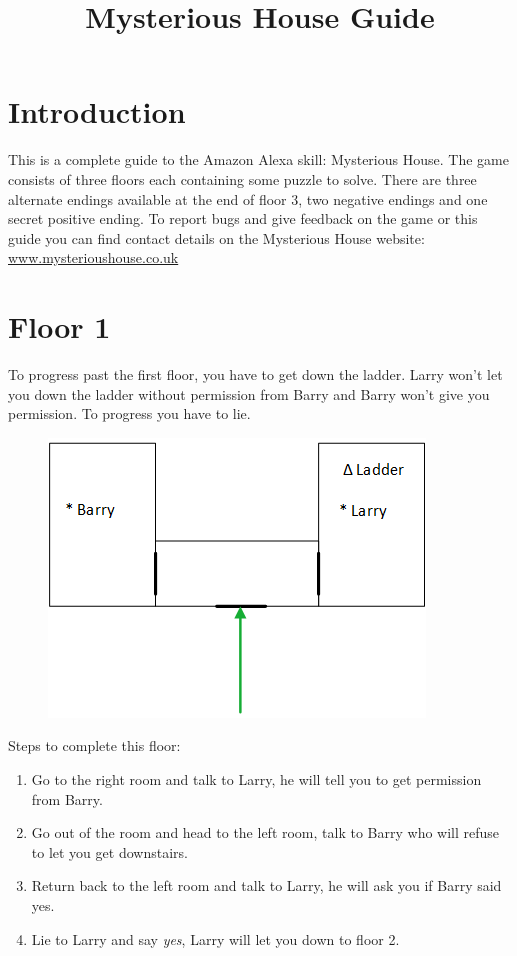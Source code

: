 \documentclass{article}
\begin{document}
\title{Mysterious House Guide}
\date{}
\maketitle

\section*{Introduction}
This is a complete guide to the Amazon Alexa skill: Mysterious House. 
The game consists of three floors each containing some puzzle to solve. 
There are three alternate endings available at the end of floor 3, two negative endings and one secret positive ending. To report bugs and give feedback on the game or this guide you can find contact details on the Mysterious House website: \url{www.mysterioushouse.co.uk}

\section*{Floor 1}
To progress past the first floor, you have to get down the ladder.
Larry won't let you down the ladder without permission from Barry and Barry won't give you permission.
To progress you have to lie.

\begin{figure}[htb]
	\centering
	\includegraphics{Floor1.png}
\end{figure}

Steps to complete this floor:

\begin{enumerate}
	\item Go to the right room and talk to Larry, he will tell you to get permission from Barry.
	\item Go out of the room and head to the left room, talk to Barry who will refuse to let you get downstairs.
	\item Return back to the left room and talk to Larry, he will ask you if Barry said yes.
	\item Lie to Larry and say \textit{yes}, Larry will let you down to floor 2.
\end{enumerate}
\end{document}
